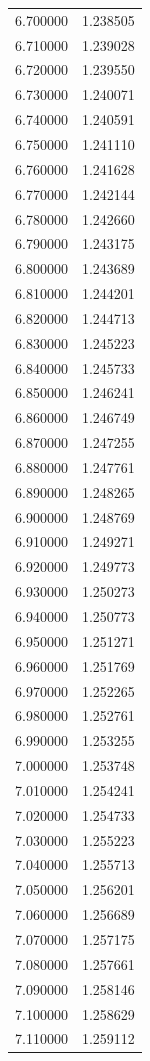 \begin{tabular}{rr}
6.700000 & 1.238505 \\
6.710000 & 1.239028 \\
6.720000 & 1.239550 \\
6.730000 & 1.240071 \\
6.740000 & 1.240591 \\
6.750000 & 1.241110 \\
6.760000 & 1.241628 \\
6.770000 & 1.242144 \\
6.780000 & 1.242660 \\
6.790000 & 1.243175 \\
6.800000 & 1.243689 \\
6.810000 & 1.244201 \\
6.820000 & 1.244713 \\
6.830000 & 1.245223 \\
6.840000 & 1.245733 \\
6.850000 & 1.246241 \\
6.860000 & 1.246749 \\
6.870000 & 1.247255 \\
6.880000 & 1.247761 \\
6.890000 & 1.248265 \\
6.900000 & 1.248769 \\
6.910000 & 1.249271 \\
6.920000 & 1.249773 \\
6.930000 & 1.250273 \\
6.940000 & 1.250773 \\
6.950000 & 1.251271 \\
6.960000 & 1.251769 \\
6.970000 & 1.252265 \\
6.980000 & 1.252761 \\
6.990000 & 1.253255 \\
7.000000 & 1.253748 \\
7.010000 & 1.254241 \\
7.020000 & 1.254733 \\
7.030000 & 1.255223 \\
7.040000 & 1.255713 \\
7.050000 & 1.256201 \\
7.060000 & 1.256689 \\
7.070000 & 1.257175 \\
7.080000 & 1.257661 \\
7.090000 & 1.258146 \\
7.100000 & 1.258629 \\
7.110000 & 1.259112 \\

\end{tabular}
